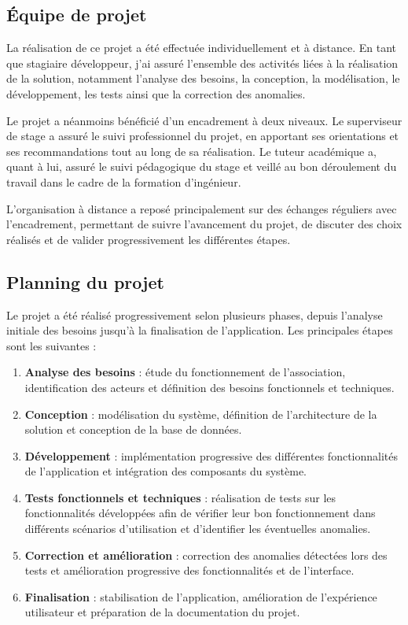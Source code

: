 \subsection{Équipe de projet}

La réalisation de ce projet a été effectuée individuellement et à distance. En tant que stagiaire développeur, j'ai assuré l'ensemble des activités liées à la réalisation de la solution, notamment l'analyse des besoins, la conception, la modélisation, le développement, les tests ainsi que la correction des anomalies.

Le projet a néanmoins bénéficié d'un encadrement à deux niveaux. Le superviseur de stage a assuré le suivi professionnel du projet, en apportant ses orientations et ses recommandations tout au long de sa réalisation. Le tuteur académique a, quant à lui, assuré le suivi pédagogique du stage et veillé au bon déroulement du travail dans le cadre de la formation d'ingénieur.

L'organisation à distance a reposé principalement sur des échanges réguliers avec l'encadrement, permettant de suivre l'avancement du projet, de discuter des choix réalisés et de valider progressivement les différentes étapes.

\subsection{Planning du projet}

Le projet a été réalisé progressivement selon plusieurs phases, depuis l'analyse initiale des besoins jusqu'à la finalisation de l'application. Les principales étapes sont les suivantes :

\begin{enumerate}
    \item \textbf{Analyse des besoins} : étude du fonctionnement de l'association, identification des acteurs et définition des besoins fonctionnels et techniques.
    \item \textbf{Conception} : modélisation du système, définition de l'architecture de la solution et conception de la base de données.
    \item \textbf{Développement} : implémentation progressive des différentes fonctionnalités de l'application et intégration des composants du système.
    \item \textbf{Tests fonctionnels et techniques} : réalisation de tests sur les fonctionnalités développées afin de vérifier leur bon fonctionnement dans différents scénarios d'utilisation et d'identifier les éventuelles anomalies.
    \item \textbf{Correction et amélioration} : correction des anomalies détectées lors des tests et amélioration progressive des fonctionnalités et de l'interface.
    \item \textbf{Finalisation} : stabilisation de l'application, amélioration de l'expérience utilisateur et préparation de la documentation du projet.
\end{enumerate}

